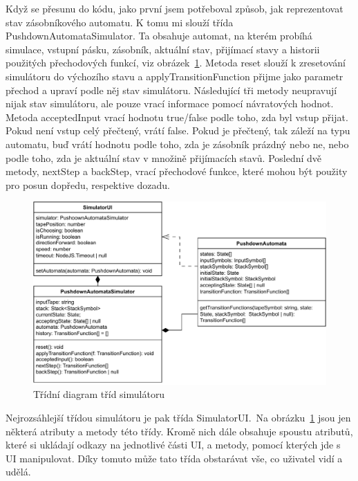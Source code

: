 Když se přesunu do kódu, jako první jsem potřeboval způsob, jak reprezentovat stav zásobníkového automatu. K tomu mi slouží třída PushdownAutomataSimulator. Ta obsahuje automat, na kterém probíhá simulace, vstupní pásku, zásobník, aktuální stav, přijímací stavy a historii použitých přechodových funkcí, viz obrázek~\ref{fig:SimulatorClasses}. Metoda reset slouží k zresetování simulátoru do výchozího stavu a applyTransitionFunction přijme jako parametr přechod a upraví podle něj stav simulátoru. Následující tři metody neupravují nijak stav simulátoru, ale pouze vrací informace pomocí návratových hodnot. Metoda acceptedInput vrací hodnotu true/false podle toho, zda byl vstup přijat. Pokud není vstup celý přečtený, vrátí false. Pokud je přečtený, tak záleží na typu automatu, buď vrátí hodnotu podle toho, zda je zásobník prázdný nebo ne, nebo podle toho, zda je aktuální stav v množině přijímacích stavů.
Poslední dvě metody, nextStep a backStep, vrací přechodové funkce, které mohou být použity pro posun dopředu, respektive dozadu.

\begin{figure}[h]
    \centering
    \includegraphics[width=\textwidth]{Figures/SimulatorClasses.drawio.pdf}
    \caption{Třídní diagram tříd simulátoru}\label{fig:SimulatorClasses}
\end{figure}

Nejrozsáhlejší třídou simulátoru je pak třída SimulatorUI.\ Na obrázku~\ref{fig:SimulatorClasses} jsou jen některá atributy a metody této třídy. Kromě nich dále obsahuje spoustu atributů, které si ukládají odkazy na jednotlivé části UI, a metody, pomocí kterých jde s UI manipulovat. Díky tomuto může tato třída obstarávat vše, co uživatel vidí a udělá.

